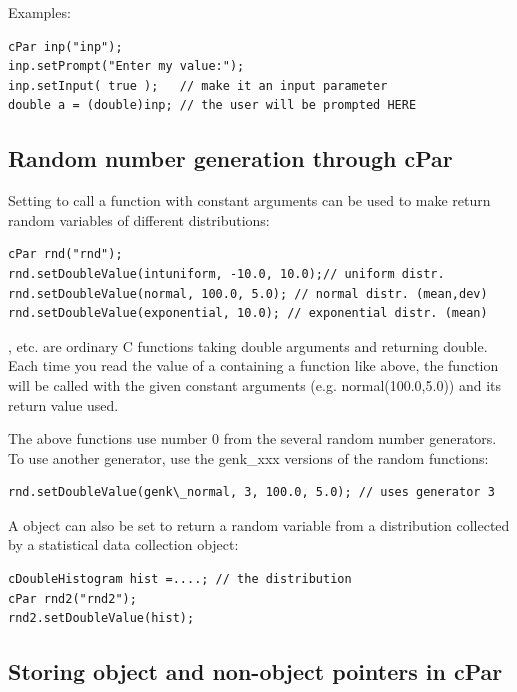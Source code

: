 Examples:

\begin{Verbatim}
cPar inp("inp");
inp.setPrompt("Enter my value:");
inp.setInput( true );   // make it an input parameter
double a = (double)inp; // the user will be prompted HERE
\end{Verbatim}




\subsection{Random number generation through cPar}

Setting  to call a function with constant arguments can
be used to make  return random variables of different distributions:

\begin{Verbatim}
cPar rnd("rnd");
rnd.setDoubleValue(intuniform, -10.0, 10.0);// uniform distr.
rnd.setDoubleValue(normal, 100.0, 5.0); // normal distr. (mean,dev)
rnd.setDoubleValue(exponential, 10.0); // exponential distr. (mean)
\end{Verbatim}

,  etc. are ordinary C functions
taking double arguments and returning double. Each time you read the
value of a  containing a function like above, the
function will be called with the given constant arguments (e.g.
normal(100.0,5.0)) and its return value used.


The above functions use number 0 from the several random number 
generators. To use another generator, use the genk\_xxx versions 
of the random functions: 

\begin{Verbatim}
rnd.setDoubleValue(genk\_normal, 3, 100.0, 5.0); // uses generator 3
\end{Verbatim}

A  object can also be set to return a random variable from 
a distribution collected by a statistical data collection object:

\begin{Verbatim}
cDoubleHistogram hist =....; // the distribution
cPar rnd2("rnd2");
rnd2.setDoubleValue(hist);
\end{Verbatim}




\subsection{Storing object and non-object pointers in cPar}

